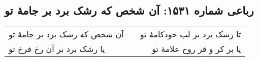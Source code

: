 \begin{center}
\section*{رباعی شماره ۱۵۳۱: آن شخص که رشک برد بر جامهٔ تو}
\label{sec:1531}
\begin{longtable}{l p{0.5cm} r}
آن شخص که رشک برد بر جامهٔ تو
&&
تا رشک برد بر لب خودکامهٔ تو
\\
یا رشک برد بر آن رخ فرخ تو
&&
یا بر کر و فر روح علامهٔ تو
\\
\end{longtable}
\end{center}
